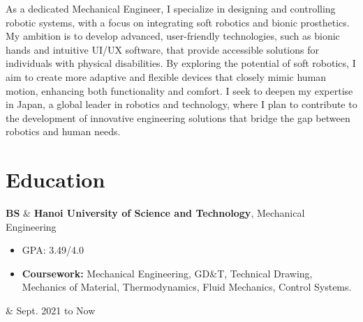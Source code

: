\documentclass[10pt, letterpaper]{article}
\newenvironment{highlights}{
        \begin{itemize}[
                topsep=0pt,
                parsep=0.10 cm,
                partopsep=0pt,
                itemsep=0pt,
                after=\vspace{-1\baselineskip},
                leftmargin=0.4 cm + 3pt
            ]
    }{
        \end{itemize}
    } %
\let\originalTabularx\tabularx
\let\originalEndTabularx\endtabularx
\renewenvironment{tabularx}{\bgroup\centering\originalTabularx}{\originalEndTabularx\par\egroup}
\begin{document}
        \begin{changemargin}{0.2 cm}{0.2 cm}
        As a dedicated Mechanical Engineer, I specialize in designing and controlling robotic systems, with a focus on integrating soft robotics and bionic prosthetics. My ambition is to develop advanced, user-friendly technologies, such as bionic hands and intuitive UI/UX software, that provide accessible solutions for individuals with physical disabilities. By exploring the potential of soft robotics, I aim to create more adaptive and flexible devices that closely mimic human motion, enhancing both functionality and comfort. I seek to deepen my expertise in Japan, a global leader in robotics and technology, where I plan to contribute to the development of innovative engineering solutions that bridge the gap between robotics and human needs.

        \end{changemargin}





    
    \section{Education}

        \begin{tabularx}{
            \textwidth-0.4 cm-0.13cm
        }{
            L{0.85cm}
            K{0.2 cm}
            R{4.1 cm}
        }
            \textbf{BS}
            &
            \textbf{Hanoi University of Science and Technology}, Mechanical Engineering

            \vspace{0.10 cm}

            \begin{highlights}
                \item GPA: 3.49/4.0
                \item \textbf{Coursework:} Mechanical Engineering, GD\&T, Technical Drawing, Mechanics of Material, Thermodynamics, Fluid Mechanics, Control Systems.
            \end{highlights}
            &
            Sept. 2021 to Now
        \end{tabularx}
\end{document}
